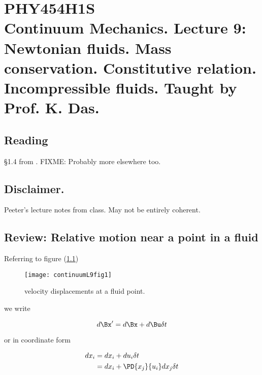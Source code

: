 
%

\chapter{PHY454H1S\\Continuum Mechanics.  Lecture 9: Newtonian fluids.  Mass conservation.  Constitutive relation.  Incompressible fluids.  Taught by Prof. K. Das.}
\label{chap:continuumL9}
{}
\date{Feb 8, 2012}

\beginArtWithToc

\section{Reading}

\S 1.4 from \cite{acheson1990elementary}.  FIXME: Probably more elsewhere too.

\section{Disclaimer.}

Peeter's lecture notes from class.  May not be entirely coherent.

\section{Review: Relative motion near a point in a fluid}

Referring to figure (\ref{fig:continuumL9:continuumL9fig1})
\begin{figure}[htp]
   \centering
   \texttt{[image: continuumL9fig1]}
   \caption{velocity displacements at a fluid point.}\label{fig:continuumL9:continuumL9fig1}
\end{figure}

we write

\begin{equation}\label{eqn:continuumL9:10}
d\Bx' = d\Bx + d\Bu \delta t
\end{equation}

or in coordinate form

\begin{equation}\label{eqn:continuumL9:30}
\begin{aligned}
dx_i 
&= dx_i + du_i \delta t \\
&= dx_i + \PD{x_j}{u_i} dx_j \delta t 
\end{aligned}
\end{equation}

